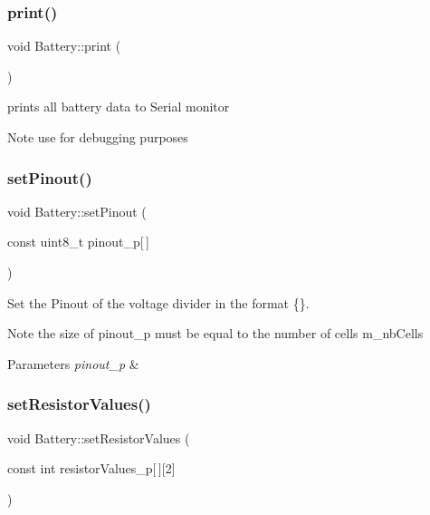 \subsubsection{\texorpdfstring{print()}{print()}}
{\footnotesize\ttfamily void Battery\+::print (\begin{DoxyParamCaption}{ }\end{DoxyParamCaption})}



prints all battery data to Serial monitor 

\begin{DoxyNote}{Note}
use for debugging purposes 
\end{DoxyNote}
\mbox{\label{class_battery_a580d9582fbcf2c5f8185e3007852f73d}} 
\subsubsection{\texorpdfstring{set\+Pinout()}{setPinout()}}
{\footnotesize\ttfamily void Battery\+::set\+Pinout (\begin{DoxyParamCaption}\item[{const uint8\+\_\+t}]{pinout\+\_\+p\mbox{[}$\,$\mbox{]} }\end{DoxyParamCaption})}



Set the Pinout of the voltage divider in the format \{\}. 

\begin{DoxyNote}{Note}
the size of pinout\+\_\+p must be equal to the number of cells m\+\_\+nb\+Cells 
\end{DoxyNote}

\begin{DoxyParams}{Parameters}
{\em pinout\+\_\+p} & \\
\hline
\end{DoxyParams}
\mbox{\label{class_battery_afb257ecd2eab7ed446d15ea9e78cc074}} 
\subsubsection{\texorpdfstring{set\+Resistor\+Values()}{setResistorValues()}}
{\footnotesize\ttfamily void Battery\+::set\+Resistor\+Values (\begin{DoxyParamCaption}\item[{const int}]{resistor\+Values\+\_\+p\mbox{[}$\,$\mbox{]}\mbox{[}2\mbox{]} }\end{DoxyParamCaption})}



